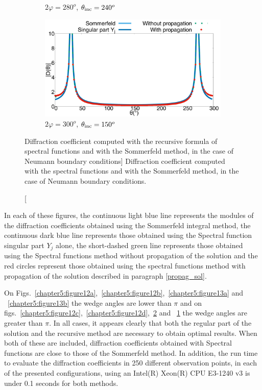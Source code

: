 \begin{figure}[h!]
\begin{subfigure}[b]{0.49\textwidth}
        \caption{$2\varphi = 280^o$, $\theta_{\rm inc} = 240^o$}
        \label{chapter5:figure13d}
    \end{subfigure}
\begin{subfigure}[b]{0.49\textwidth}
        \includegraphics[width=\textwidth]{images/chapter2/Figure9d.pdf}
        \caption{$2\varphi = 300^o$, $\theta_{\rm inc} = 150^o$}
        \label{chapter5:figure13c}
    \end{subfigure}
\caption
[Diffraction  coefficient computed with the recursive formula of spectral functions and with the Sommerfeld method, in the case of Neumann boundary conditions]
{Diffraction  coefficient computed with the spectral functions and with the Sommerfeld method, in the case of Neumann boundary conditions.}
\label{chapter5:figure13}
\end{figure}


 In each of these figures, the continuous light blue line represents the modules of the diffraction coefficients obtained using the Sommerfeld integral method, the continuous dark blue line represents those obtained using the Spectral function singular part $Y_j$ alone, the short-dashed green line represents those obtained using the Spectral functions method without propagation of the solution and the red circles represent those obtained using the spectral functions method with propagation of the solution described in paragraph \ref{propag_sol}.

On Figs.~\ref{chapter5:figure12a},~\ref{chapter5:figure12b},~\ref{chapter5:figure13a} and ~\ref{chapter5:figure13b} the wedge angles are lower than $\pi$ and on figs.~\ref{chapter5:figure12c},~\ref{chapter5:figure12d},~\ref{chapter5:figure13c} and ~\ref{chapter5:figure13d} the wedge angles are greater than $\pi$. In all cases, it appears clearly that both the regular part of the solution and the recursive method are necessary to obtain optimal results. When both of these are included, diffraction coefficients obtained with Spectral functions are close to those of the Sommerfeld method. In addition, the run time to evaluate the diffraction coefficients in 250 different observation points, in each of the presented configurations, using an Intel(R) Xeon(R) CPU E3-1240 v3 is under 0.1 seconds for both methods. 